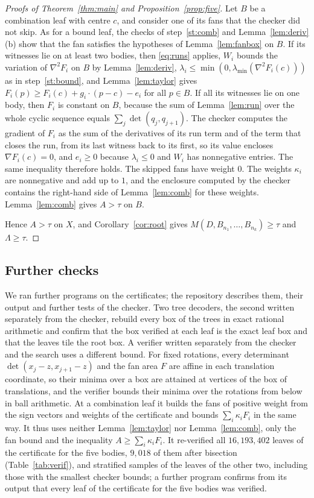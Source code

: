 \documentclass[11pt]{amsart}
\theoremstyle{definition}
\theoremstyle{remark}
\numberwithin{equation}{section}
\newcommand{\lmin}{\lambda_{\min}}
\newcommand{\LeavesFive}{16{,}193{,}402}
\begin{document}
\begin{proof}[Proofs of Theorem~\ref{thm:main} and Proposition~\ref{prop:five}]
Let $B$ be a combination leaf with centre $c$, and consider one of its fans that the checker did not skip. As for a bound leaf, the checks of step~\ref{st:comb} and Lemma~\ref{lem:deriv}(b) show that the fan satisfies the hypotheses of Lemma~\ref{lem:fanbox} on $B$. If its witnesses lie on at least two bodies, then \eqref{eq:runs} applies, $W_i$ bounds the variation of $\nabla^2F_i$ on $B$ by Lemma~\ref{lem:deriv}, $\lambda_i\le\min(0,\lmin(\nabla^2F_i(c)))$ as in step~\ref{st:bound}, and Lemma~\ref{lem:taylor} gives $F_i(p)\ge F_i(c)+g_i\cdot(p-c)-e_i$ for all $p\in B$. If all its witnesses lie on one body, then $F_i$ is constant on $B$, because the sum of Lemma~\ref{lem:run} over the whole cyclic sequence equals $\sum_j\det(q_j,q_{j+1})$. The checker computes the gradient of $F_i$ as the sum of the derivatives of its run term and of the term that closes the run, from its last witness back to its first, so its value encloses $\nabla F_i(c)=0$, and $e_i\ge0$ because $\lambda_i\le0$ and $W_i$ has nonnegative entries. The same inequality therefore holds. The skipped fans have weight $0$. The weights $\kappa_i$ are nonnegative and add up to $1$, and the enclosure computed by the checker contains the right-hand side of Lemma~\ref{lem:comb} for these weights. Lemma~\ref{lem:comb} gives $A>\tau$ on $B$.

Hence $A>\tau$ on $X$, and Corollary~\ref{cor:root} gives $M(D,B_{n_1},\dots,B_{n_k})\ge\tau$ and $\Lambda\ge\tau$.
\end{proof}

\subsection{Further checks}\label{sec:checks}
We ran further programs on the certificates; the repository describes them, their output and further tests of the checker. Two tree decoders, the second written separately from the checker, rebuild every box of the trees in exact rational arithmetic and confirm that the box verified at each leaf is the exact leaf box and that the leaves tile the root box. A verifier written separately from the checker and the search uses a different bound. For fixed rotations, every determinant $\det(x_j-z,x_{j+1}-z)$ and the fan area $F$ are affine in each translation coordinate, so their minima over a box are attained at vertices of the box of translations, and the verifier bounds their minima over the rotations from below in ball arithmetic. At a combination leaf it builds the fans of positive weight from the sign vectors and weights of the certificate and bounds $\sum_i\kappa_iF_i$ in the same way. It thus uses neither Lemma~\ref{lem:taylor} nor Lemma~\ref{lem:comb}, only the fan bound and the inequality $A\ge\sum_i\kappa_iF_i$. It re-verified all $\LeavesFive$ leaves of the certificate for the five bodies, $9{,}018$ of them after bisection (Table~\ref{tab:verif}), and stratified samples of the leaves of the other two, including those with the smallest checker bounds; a further program confirms from its output that every leaf of the certificate for the five bodies was verified.
\end{document}
